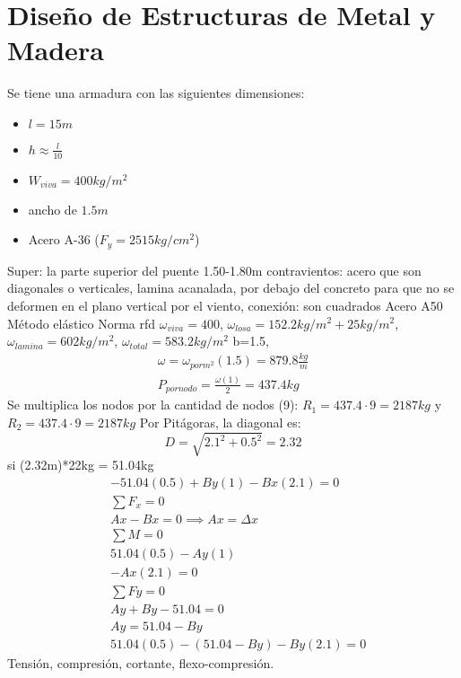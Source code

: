 \chapter{Diseño de Estructuras de Metal y Madera}

\begin{example}
  Se tiene una armadura con las siguientes dimensiones:
  \begin{itemize}
    \item $l=15m$
    \item $h\approx \frac{l}{10}$
    \item $W_{viva}= 400 kg/m^2$
    \item ancho de $1.5m$
    \item Acero A-36 ($F_y=2515kg/cm^2$)
  \end{itemize}
\end{example}

Super: la parte superior del puente
1.50-1.80m
contravientos: acero que son diagonales o verticales,
lamina acanalada, por debajo del concreto para que no se deformen en el plano vertical por el viento,
conexión: son cuadrados
Acero A50
Método elástico
Norma rfd
$\omega_{viva}=400$, $\omega_{losa}=152.2kg/m^2+25kg/m^2$, $\omega_{lamina}=602kg/m^2$, $\omega_{total}= 583.2kg/m^2$ b=1.5, 
\begin{align*}
    \omega = \omega_{por m^2}(1.5) = 879.8 \frac{kg}{m}\\
    P_{por nodo} = \frac{\omega(1)}{2} = 437.4kg
\end{align*}
Se multiplica los nodos por la cantidad de nodos (9):
$R_1=437.4\cdot 9=2187kg$ y $R_2=437.4\cdot 9=2187kg$
Por Pitágoras, la diagonal es:
\begin{equation*}
    D = \sqrt{2.1^2 + 0.5^2} = 2.32
\end{equation*}
si (2.32m)*22kg = 51.04kg
\begin{align*}
    &- 51.04(0.5) + By(1) - Bx(2.1) = 0\\
    &\sum F_x = 0\\
    &Ax - Bx = 0\implies Ax = \Delta x\\
    &\sum M = 0\\
    &51.04(0.5) - Ay(1)\\
    &- Ax(2.1) = 0\\
    &\sum Fy = 0\\
    &Ay + By - 51.04 = 0\\
    &Ay = 51.04 - By\\
    &51.04(0.5) -(51.04 - By) - By(2.1) = 0
\end{align*}
Tensión, compresión, cortante, flexo-compresión.

